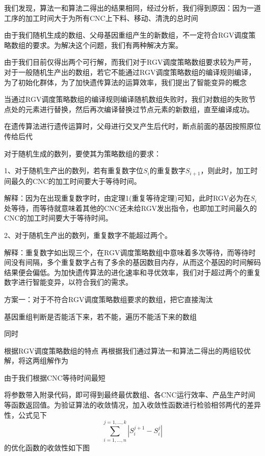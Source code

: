 \documentclass[withoutpreface,bwprint]{cumcmthesis} %
\begin{document}
我们发现，算法一和算法二得出的结果相同，经过分析，我们得到原因：因为一道工序的加工时间大于为所有CNC上下料、移动、清洗的总时间

由于我们随机生成的数组、父母基因重组产生的新数组，不一定符合RGV调度策略数组的要求。为解决这个问题，我们有两种解决方案。

由于我们目前仅得出两个可行解，而我们对于RGV调度策略数组要求较为严苛，对于一般随机生产出的数组，若它不能通过RGV调度策略数组的编译规则编译，为了初始化群体，为了加快遗传算法的运算效率，我们提出了智能变异的概念
\begin{definition}[智能变异] 
当通过RGV调度策略数组的编译规则编译随机数组失败时，我们对数组的失败节点处的元素进行替换，然后再次编译替换过节点元素的新数组，直至编译成功。
\end{definition}

\begin{definition}[留头交叉] 
在遗传算法进行遗传运算时，父母进行交叉产生后代时，断点前面的基因按照原位传给后代
\end{definition}

对于随机生成的数列，要使其为策略数组的要求：

1、对于随机生产出的数列，若有重复数字位$S_i$的重复数字$S_{i+1}$，则此时，加工时间最久的CNC的加工时间要大于等待时间。

解释：因为在出现重复数字时，由定理1(重复等待定理)可知，此时RGV必为在$S_i$处等待，而等待就意味着其他的CNC还未给RGV发出指令，也即加工时间最久的CNC的加工时间要大于等待时间。

2、对于随机生产出的数列，重复数字不能超过两个。

解释：重复数字如出现三个，在RGV调度策略数组中意味着多次等待，而等待时间没有间隔，多个重复数字占有了多余的基因数目内存，从而这个基因的时间解码结果便会偏低。为加快遗传算法的进化速率和寻优效率，我们对于超过两个的重复数字进行智能变异，以符合我们的需求。

方案一：对于不符合RGV调度策略数组要求的数组，把它直接淘汰


基因重组判断是否能活下来，若不能，遍历不能活下来的数组


同时



根据RGV调度策略数组的特点
再根据我们通过算法一和算法二得出的两组较优解，将这两组解作为


由于我们根据CNC等待时间最短

将参数带入附录代码，即可得到最终最优数组、各CNC运行效率、产品生产时间等函数返回值。为验证算法的收敛情况，加入收敛性函数进行检验相邻两代的差异性，公式见下
\begin{equation}
	\sum_{i=1,...,n}^{j=1,...,k}|S^{j+1}_i-S^{j}_i|
\end{equation}
的优化函数的收敛性如下图
\end{document}
